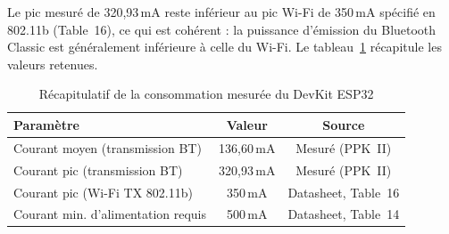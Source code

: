 Le pic mesuré de 320,93\,mA reste inférieur au pic Wi-Fi de 350\,mA spécifié en 802.11b (Table~16), ce qui est cohérent : la puissance d'émission du Bluetooth Classic est généralement inférieure à celle du Wi-Fi. Le tableau~\ref{tab:mesure_esp32} récapitule les valeurs retenues.

\begin{table}[H]
    \centering
    \caption{Récapitulatif de la consommation mesurée du DevKit ESP32}
    \label{tab:mesure_esp32}
    \begin{tabular}{l c c}
        \hline
        \textbf{Paramètre}                 & \textbf{Valeur} & \textbf{Source}     \\
        \hline
        Courant moyen (transmission BT)    & 136,60\,mA      & Mesuré (PPK~II)     \\
        Courant pic (transmission BT)      & 320,93\,mA      & Mesuré (PPK~II)     \\
        Courant pic (Wi-Fi TX 802.11b)     & 350\,mA         & Datasheet, Table~16 \\
        Courant min. d'alimentation requis & 500\,mA         & Datasheet, Table~14 \\
        \hline
    \end{tabular}
\end{table}